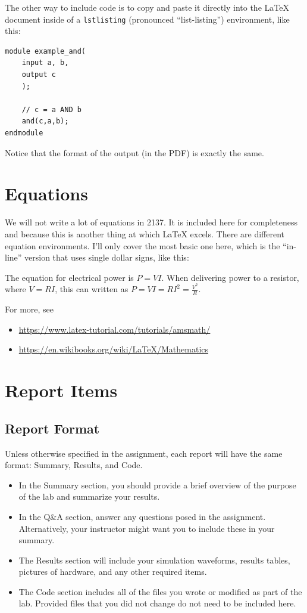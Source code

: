 \documentclass[11pt]{article}
\begin{document}
The other way to include code is to copy and paste it directly into the LaTeX document inside of a \texttt{lstlisting} (pronounced ``list-listing'') environment, like this:

\begin{lstlisting}[style=Verilog,
caption=Direct Verilog code example,
label=code:ex 
]
module example_and(
	input a, b,
	output c
	);
	
	// c = a AND b
	and(c,a,b);	
endmodule
\end{lstlisting}

Notice that the format of the output (in the PDF) is exactly the same.


\section*{Equations}
We will not write a lot of equations in 2137.  It is included here for completeness and because this is another thing at which LaTeX excels.  There are different equation environments.  I'll only cover the most basic one here, which is the ``in-line'' version that uses single dollar signs, like this:

The equation for electrical power is $P = VI$.  When delivering power to a resistor, where $V = RI$, this can written as $P = VI = RI^2 = \frac{V^2}{R}$.

For more, see
\begin{itemize}
	\item \url{https://www.latex-tutorial.com/tutorials/amsmath/}
	\item \url{https://en.wikibooks.org/wiki/LaTeX/Mathematics}
\end{itemize}



\section*{Report Items}

\subsection*{Report Format}
Unless otherwise specified in the assignment, each report will have the same format: Summary, Results, and Code. 
\begin{itemize}
	\item In the Summary section, you should provide a brief overview of the purpose of the lab and summarize your results. 
	\item In the Q\&A section, answer any questions posed in the assignment.  Alternatively, your instructor might want you to include these in your summary.
	\item The Results section will include your simulation waveforms, results tables, pictures of hardware, and any other required items.  
	\item The Code section includes all of the files you wrote or modified as part of the lab.  Provided files that you did not change do not need to be included here.
\end{itemize}
\end{document}
